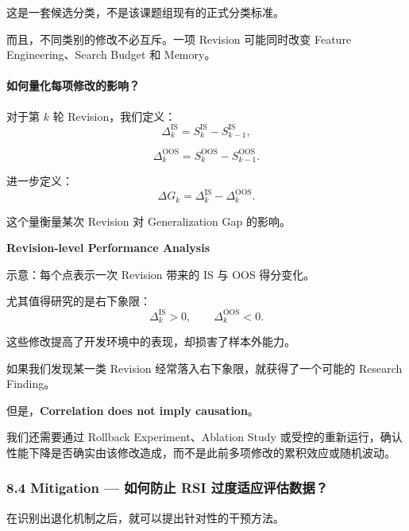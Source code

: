 这是一套候选分类，不是该课题组现有的正式分类标准。

而且，不同类别的修改不必互斥。一项 Revision 可能同时改变 Feature Engineering、Search Budget 和 Memory。

\hypertarget{part-1-07-0001-ux5982ux4f55ux91cfux5316ux6bcfux9879ux4feeux6539ux7684ux5f71ux54cd}{%
\paragraph{如何量化每项修改的影响？}\label{part-1-07-0001-ux5982ux4f55ux91cfux5316ux6bcfux9879ux4feeux6539ux7684ux5f71ux54cd}}

对于第 \(k\) 轮 Revision，我们定义：
\[\Delta_k^{\mathrm{IS}}
=
S_k^{\mathrm{IS}}-S_{k-1}^{\mathrm{IS}},\]

\[\Delta_k^{\mathrm{OOS}}
=
S_k^{\mathrm{OOS}}-S_{k-1}^{\mathrm{OOS}}.\]

进一步定义：
\[\Delta G_k
=
\Delta_k^{\mathrm{IS}}
-
\Delta_k^{\mathrm{OOS}}.\]

这个量衡量某次 Revision 对 Generalization Gap 的影响。

\textbf{Revision-level Performance Analysis}

示意：每个点表示一次 Revision 带来的 IS 与 OOS 得分变化。


尤其值得研究的是右下象限：
\[\Delta_k^{\mathrm{IS}}>0,
\qquad
\Delta_k^{\mathrm{OOS}}<0.\]

这些修改提高了开发环境中的表现，却损害了样本外能力。

如果我们发现某一类 Revision 经常落入右下象限，就获得了一个可能的 Research Finding。

但是，\textbf{Correlation does not imply causation}。

我们还需要通过 Rollback Experiment、Ablation Study 或受控的重新运行，确认性能下降是否确实由该修改造成，而不是此前多项修改的累积效应或随机波动。

\hypertarget{part-1-07-0001-mitigation-ux5982ux4f55ux9632ux6b62-rsi-ux8fc7ux5ea6ux9002ux5e94ux8bc4ux4f30ux6570ux636e}{%
\subsubsection{8.4 Mitigation --- 如何防止 RSI 过度适应评估数据？}\label{part-1-07-0001-mitigation-ux5982ux4f55ux9632ux6b62-rsi-ux8fc7ux5ea6ux9002ux5e94ux8bc4ux4f30ux6570ux636e}}

在识别出退化机制之后，就可以提出针对性的干预方法。

